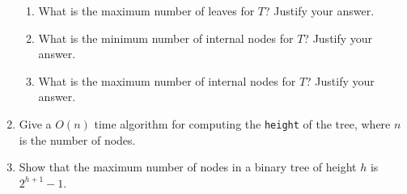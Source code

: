 \documentclass[11pt]{article}
\begin{document}
\begin{enumerate}
\begin{enumerate}
        \item What is the maximum number of leaves for $T$?  Justify your answer.
        
        \item What is the minimum number of internal nodes for $T$?  Justify your answer.
        
        \item What is the maximum number of internal nodes for $T$?  Justify your answer.
    \end{enumerate}

    \item Give a $O(n)$ time algorithm for computing the \verb|height| of the tree, where $n$ is the number of nodes.

    \item Show that the maximum number of nodes in a binary tree of height $h$ is $2^{h+1}-1$.

    \end{enumerate}
    
    \label{r:lastpage}
    
    
\end{document}
